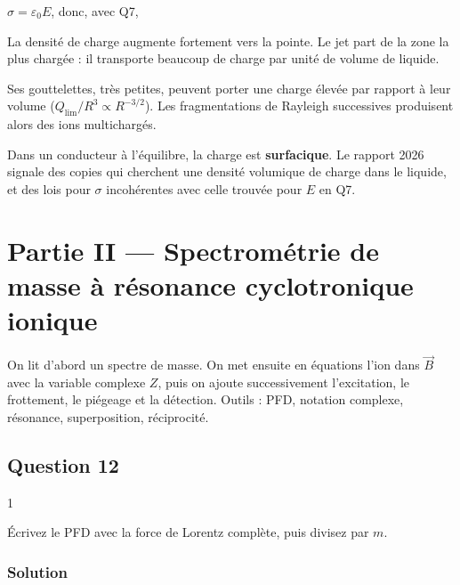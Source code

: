 \documentclass[11pt,a4paper]{article}
\newcommand{\equationajustee}[1]{%
  \sbox{\boiteequation}{$\displaystyle #1$}%
  \ifdim\wd\boiteequation>\linewidth
    \[\resizebox{\linewidth}{!}{\usebox{\boiteequation}}\]%
  \else
    \[#1\]%
  \fi}
\begin{document}
\(\sigma=\varepsilon_0E\), donc, avec Q7,

\equationajustee{\boxed{\sigma\propto r^{-1/2}}}

La densité de charge augmente fortement vers la pointe. Le jet part de la zone la plus chargée : il transporte beaucoup de charge par unité de volume de liquide.

Ses gouttelettes, très petites, peuvent porter une charge élevée par rapport à leur volume (\(Q_{\lim}/R^3\propto R^{-3/2}\)). Les fragmentations de Rayleigh successives produisent alors des ions multichargés.

\begin{piege}

Dans un conducteur à l'équilibre, la charge est \textbf{surfacique}. Le rapport 2026 signale des copies qui cherchent une densité volumique de charge dans le liquide, et des lois pour \(\sigma\) incohérentes avec celle trouvée pour \(E\) en Q7.

\end{piege}

\hypertarget{partie-ii-spectromuxe9trie-de-masse-uxe0-ruxe9sonance-cyclotronique-ionique}{%
\section{Partie II --- Spectrométrie de masse à résonance cyclotronique ionique}\label{partie-ii-spectromuxe9trie-de-masse-uxe0-ruxe9sonance-cyclotronique-ionique}}

On lit d'abord un spectre de masse. On met ensuite en équations l'ion dans \(\vec B\) avec la variable complexe \(Z\), puis on ajoute successivement l'excitation, le frottement, le piégeage et la détection. Outils : PFD, notation complexe, résonance, superposition, réciprocité.

\hypertarget{question-12}{%
\subsection{Question 12}\label{question-12}}

\begin{indication}{1}

Écrivez le PFD avec la force de Lorentz complète, puis divisez par \(m\).

\end{indication}

\hypertarget{solution-11}{%
\subsubsection{Solution}\label{solution-11}}
\end{document}
